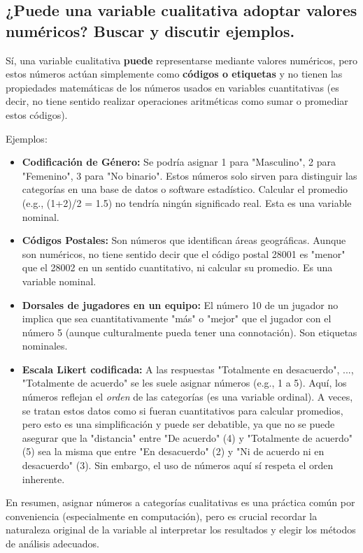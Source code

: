 \documentclass[12pt, letterpaper]{article}
\begin{document}
\subsection{¿Puede una variable cualitativa adoptar valores numéricos? Buscar y discutir ejemplos.}
Sí, una variable cualitativa \textbf{puede} representarse mediante valores numéricos, pero estos números actúan simplemente como \textbf{códigos o etiquetas} y no tienen las propiedades matemáticas de los números usados en variables cuantitativas (es decir, no tiene sentido realizar operaciones aritméticas como sumar o promediar estos códigos).

Ejemplos:
\begin{itemize}
    \item \textbf{Codificación de Género:} Se podría asignar 1 para "Masculino", 2 para "Femenino", 3 para "No binario". Estos números solo sirven para distinguir las categorías en una base de datos o software estadístico. Calcular el promedio (e.g., (1+2)/2 = 1.5) no tendría ningún significado real. Esta es una variable nominal.
    \item \textbf{Códigos Postales:} Son números que identifican áreas geográficas. Aunque son numéricos, no tiene sentido decir que el código postal 28001 es "menor" que el 28002 en un sentido cuantitativo, ni calcular su promedio. Es una variable nominal.
    \item \textbf{Dorsales de jugadores en un equipo:} El número 10 de un jugador no implica que sea cuantitativamente "más" o "mejor" que el jugador con el número 5 (aunque culturalmente pueda tener una connotación). Son etiquetas nominales.
    \item \textbf{Escala Likert codificada:} A las respuestas "Totalmente en desacuerdo", ..., "Totalmente de acuerdo" se les suele asignar números (e.g., 1 a 5). Aquí, los números reflejan el \textit{orden} de las categorías (es una variable ordinal). A veces, se tratan estos datos como si fueran cuantitativos para calcular promedios, pero esto es una simplificación y puede ser debatible, ya que no se puede asegurar que la "distancia" entre "De acuerdo" (4) y "Totalmente de acuerdo" (5) sea la misma que entre "En desacuerdo" (2) y "Ni de acuerdo ni en desacuerdo" (3). Sin embargo, el uso de números aquí sí respeta el orden inherente.
\end{itemize}
En resumen, asignar números a categorías cualitativas es una práctica común por conveniencia (especialmente en computación), pero es crucial recordar la naturaleza original de la variable al interpretar los resultados y elegir los métodos de análisis adecuados.
\end{document}
